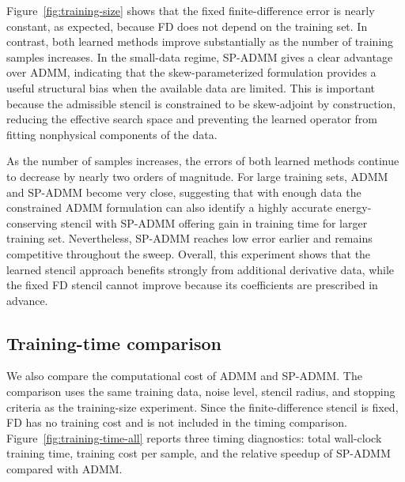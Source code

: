 \documentclass[11pt]{article}
\numberwithin{equation}{section}
\numberwithin{figure}{section}
\numberwithin{table}{section}
\begin{document}
Figure~\ref{fig:training-size} shows that the fixed finite-difference error is
nearly constant, as expected, because FD does not depend on the training set.
In contrast, both learned methods improve substantially as the number of
training samples increases. In the small-data regime, SP-ADMM gives a clear
advantage over ADMM, indicating that the skew-parameterized formulation
provides a useful structural bias when the available data are limited. This is
important because the admissible stencil is constrained to be skew-adjoint by
construction, reducing the effective search space and preventing the learned
operator from fitting nonphysical components of the data.

As the number of samples increases, the errors of both learned methods
continue to decrease by nearly two orders of magnitude. For large training
sets, ADMM and SP-ADMM become very close, suggesting that with enough data the
constrained ADMM formulation can also identify a highly accurate
energy-conserving stencil with SP-ADMM offering gain in training time for larger training set. Nevertheless, SP-ADMM reaches low error earlier and
remains competitive throughout the sweep. Overall, this experiment shows that
the learned stencil approach benefits strongly from additional derivative
data, while the fixed FD stencil cannot improve because its coefficients are
prescribed in advance.

\subsection{Training-time comparison}
\label{subsec:training-time}

We also compare the computational cost of ADMM and SP-ADMM. The comparison
uses the same training data, noise level, stencil radius, and stopping
criteria as the training-size experiment. Since the finite-difference stencil
is fixed, FD has no training cost and is not included in the timing comparison.
Figure~\ref{fig:training-time-all} reports three timing diagnostics: total
wall-clock training time, training cost per sample, and the relative speedup
of SP-ADMM compared with ADMM.
\end{document}
